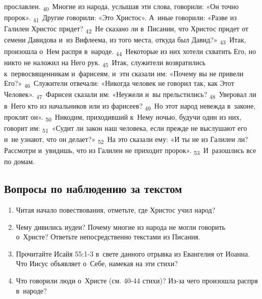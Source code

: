 \documentclass[a4paper,12pt]{article}
\begin{document}
прославлен. \textsubscript{40}~Многие из народа, услышав эти слова, говорили: «Он точно пророк». \textsubscript{41}~Другие говорили: «Это Христос». А~иные говорили: «Разве из Галилеи Христос придет? \textsubscript{42}~Не сказано ли в~Писании, что Христос придет от семени Давидова и~из Вифлеема, из того места, откуда был Давид?» \textsubscript{43}~Итак, произошла о~Нем распря в~народе. \textsubscript{44}~Некоторые из них хотели схватить Его, но никто не наложил на Него рук. \textsubscript{45}~Итак, служители возвратились к~первосвященникам и~фарисеям, и~эти сказали им: «Почему вы не привели Его?» \textsubscript{46}~Служители отвечали: «Никогда человек не говорил так, как Этот Человек». \textsubscript{47}~Фарисеи сказали им: «Неужели и~вы прельстились? \textsubscript{48}~Уверовал ли в~Него кто из начальников или из фарисеев? \textsubscript{49}~Но этот народ невежда в~законе, проклят он». \textsubscript{50}~Никодим, приходивший к~Нему ночью, будучи один из них, говорит им: \textsubscript{51}~«Судит ли закон наш человека, если прежде не выслушают его и~не узнают, что он делает?» \textsubscript{52}~На это сказали ему: «И ты не из Галилеи ли? Рассмотри и~увидишь, что из Галилеи не приходит пророк». \textsubscript{53}~И~разошлись все по домам. 

\subsection*{Вопросы по наблюдению за текстом}
\begin{enumerate}
    \item Читая начало повествования, отметьте, где Христос учил народ? 
    
    \myline
    
    \item Чему дивились иудеи? Почему многие из народа не могли говорить о~Христе? Ответьте непосредственно текстами из Писания. 
    
    \myline
    
    \myline
    \item Прочитайте Исайя 55:1-3 в~свете данного отрывка из Евангелия от Иоанна. Что Иисус объявляет о~Себе, намекая на эти стихи? 
    
    \myline
    
    \myline
    \item Что говорили люди о~Христе (см. 40-44 стихи)? Из-за чего произошла распря в~народе? 
    
    \myline
    
    \myline
\end{enumerate}
\end{document}
